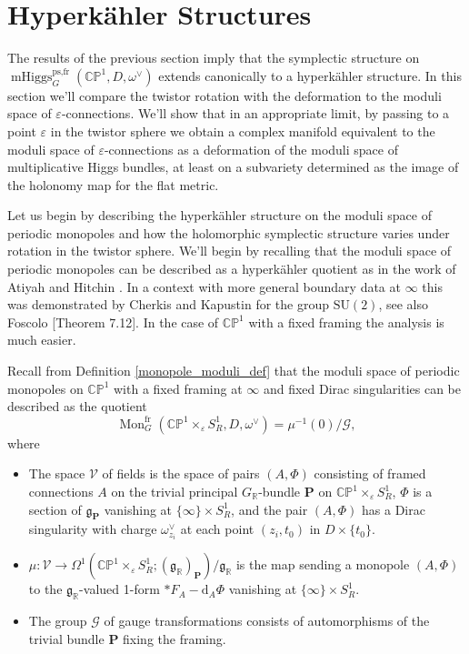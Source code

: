 \documentclass[11pt, oneside, reqno]{amsart}
\theoremstyle{definition} \newtheorem{definition}{Definition}[section]
\theoremstyle{definition} \newtheorem{remark}[definition]{Remark}
\theoremstyle{definition} \newtheorem{remarks}[definition]{Remarks}
\theoremstyle{definition} \newtheorem{question}[definition]{Question}
\theoremstyle{definition} \newtheorem*{note}{Note}
\theoremstyle{definition} \newtheorem{example}[definition]{Example}
\theoremstyle{definition} \newtheorem{examples}[definition]{Examples}
\renewcommand{\gg}{\mathfrak{g}}
\newcommand{\bb}[1]{\mathbb{#1}}
\newcommand{\mc}[1]{\mathcal{#1}}
\newcommand{\bo}[1]{\boldsymbol{#1}}
\newcommand{\RR}{\mathbb{R}}
\newcommand{\eps}{\varepsilon}
\newcommand{\SU}{\mathrm{SU}}
\DeclareMathOperator{\mhiggs}{mHiggs}
\DeclareMathOperator{\mon}{Mon}
\renewcommand{\d}{\mathrm{d}}
\newcommand{\fr}{\mathrm{fr}}
\begin{document}
\section{Hyperk\"ahler Structures} \label{hyperkahler_section}
The results of the previous section imply that the symplectic structure on $\mhiggs_G^{\text{ps,fr}}(\bb{CP}^1,D,\omega^\vee)$ extends canonically to a hyperk\"ahler structure.  In this section we'll compare the twistor rotation with the deformation to the moduli space of $\eps$-connections. We'll show that in an appropriate limit, by passing to a point $\eps$ in the twistor sphere we obtain a complex manifold equivalent to the moduli space of $\eps$-connections as a deformation of the moduli space of multiplicative Higgs bundles, at least on a subvariety determined as the image of the holonomy map for the flat metric.

Let us begin by describing the hyperk\"ahler structure on the moduli space of periodic monopoles and how the holomorphic symplectic structure varies under rotation in the twistor sphere.  We'll begin by recalling that the moduli space of periodic monopoles can be described as a hyperk\"ahler quotient as in the work of Atiyah and Hitchin \cite{AtiyahHitchin}.  In a context with more general boundary data at $\infty$ this was demonstrated by Cherkis and Kapustin \cite{CherkisKapustin3} for the group $\SU(2)$, see also Foscolo \cite{FoscoloDef}[Theorem 7.12].  In the case of $\bb{CP}^1$ with a fixed framing the analysis is much easier.

Recall from Definition \ref{monopole_moduli_def} that the moduli space of periodic monopoles on $\bb{CP}^1$ with a fixed framing at $\infty$ and fixed Dirac singularities can be described as the quotient 
\[\mon_G^{\fr}(\bb{CP}^1 \times_\eps S^1_R, D, \omega^\vee) = \mu^{-1}(0)/\mc G,\]
where 
\begin{itemize}
\item The space $\mc V$ of fields is the space of pairs $(A,\Phi)$ consisting of framed connections $A$ on the trivial principal $G_\RR$-bundle $\bo P$ on $\bb{CP}^1 \times_\eps S^1_R$, $\Phi$ is a section of $\gg_{\bo P}$ vanishing at $\{\infty\} \times S^1_R$, and the pair $(A,\Phi)$ has a Dirac singularity with charge $\omega^\vee_{z_i}$ at each point $(z_i,t_0)$ in $D \times \{t_0\}$.
\item $\mu \colon \mc V \to \Omega^1(\bb{CP}^1 \times_\eps S^1_R; (\gg_\RR)_{\bo P})/\gg_\RR$ is the map sending a monopole $(A, \Phi)$ to the $\gg_\RR$-valued 1-form $\ast F_A - \d_A \Phi$ vanishing at $\{\infty\} \times S^1_R$.  
\item The group $\mc G$ of gauge transformations consists of automorphisms of the trivial bundle $\bo P$ fixing the framing.
\end{itemize}
\end{document}
